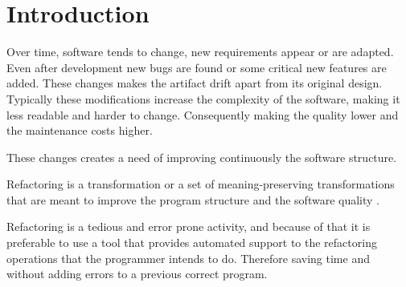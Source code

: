 
% 
% 

\section{Introduction}


Over time, software tends to change, new requirements appear or are adapted. 
Even after development new bugs are found or some critical new features are added.
These changes makes the artifact drift apart from its original design.
Typically these modifications increase the complexity of the software, making it less readable and harder to change. 
Consequently making the quality lower and the maintenance costs higher. %

These changes creates a need of improving continuously the software structure.

Refactoring is a transformation or a set of meaning-preserving transformations that are meant to improve the program structure and the software quality \cite{bourquin2007high}.



Refactoring is a tedious and error prone activity, and because of that it is preferable to use a tool that provides automated support to the refactoring operations that the programmer intends to do. 
Therefore saving time and without adding errors to a previous correct program.

